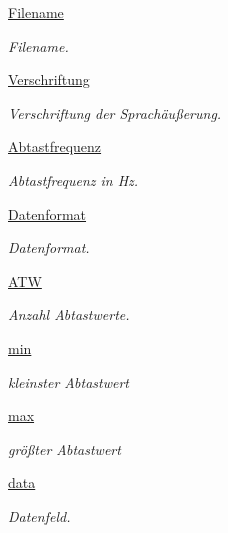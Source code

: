 \begin{DoxyCompactItemize}
\item 
\mbox{\hyperlink{classsounddata_1_1_sounddata_ab95569d979168deb16d06ddfdb838603}{Filename}}
\begin{DoxyCompactList}\small\item\em Filename. \end{DoxyCompactList}\item 
\mbox{\hyperlink{classsounddata_1_1_sounddata_a9a4ef06c4e02480837e12b98e1e75bfe}{Verschriftung}}
\begin{DoxyCompactList}\small\item\em Verschriftung der Sprachäußerung. \end{DoxyCompactList}\item 
\mbox{\hyperlink{classsounddata_1_1_sounddata_a1519ee17817b6a2c9107ca5e5d09f204}{Abtastfrequenz}}
\begin{DoxyCompactList}\small\item\em Abtastfrequenz in Hz. \end{DoxyCompactList}\item 
\mbox{\hyperlink{classsounddata_1_1_sounddata_ada2e26b302a4e72ce4a77858510032eb}{Datenformat}}
\begin{DoxyCompactList}\small\item\em Datenformat. \end{DoxyCompactList}\item 
\mbox{\hyperlink{classsounddata_1_1_sounddata_afe517ca7dfaa55c4418966f98063dda8}{A\+TW}}
\begin{DoxyCompactList}\small\item\em Anzahl Abtastwerte. \end{DoxyCompactList}\item 
\mbox{\hyperlink{classsounddata_1_1_sounddata_a57cdccd0a2cae0a3f39b7a40a6f1d5f8}{min}}
\begin{DoxyCompactList}\small\item\em kleinster Abtastwert \end{DoxyCompactList}\item 
\mbox{\hyperlink{classsounddata_1_1_sounddata_a9d4467c1e463d7edacf1d4f540d0f3d1}{max}}
\begin{DoxyCompactList}\small\item\em größter Abtastwert \end{DoxyCompactList}\item 
\mbox{\hyperlink{classsounddata_1_1_sounddata_a64a625b1f08e5888cd34e14aad188cc0}{data}}
\begin{DoxyCompactList}\small\item\em Datenfeld. \end{DoxyCompactList}\end{DoxyCompactItemize}


